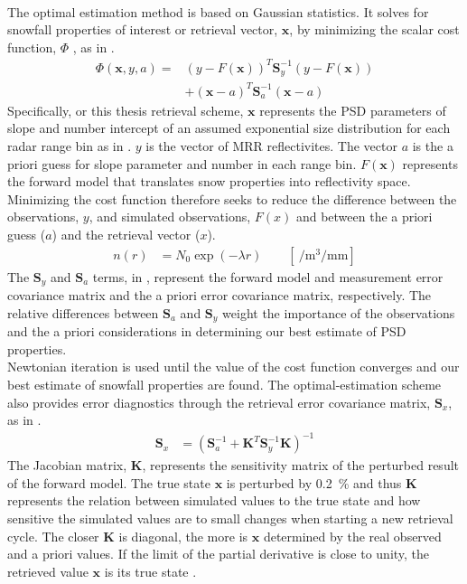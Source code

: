 \\
The optimal estimation method is based on Gaussian statistics.  It solves for snowfall properties of interest or retrieval vector, $\mathbf{x}$, by minimizing the scalar cost function, $\Phi$ , as in .
\begin{equation}
\begin{split}
\Phi(\mathbf{x},y,a) = & (y- F(\mathbf{x}))^T \mathbf{S}_y^{-1} 			(y-F(\mathbf{x})) \\
&+(\mathbf{x}-a)^T \mathbf{S}_{a}^{-1} (\mathbf{x}-a)
\end{split} \label{eq:scalar_cost_fct}
\end{equation}
Specifically, or this thesis retrieval scheme, $\mathbf{x}$ represents the PSD parameters of slope and number intercept of an assumed exponential size distribution for each radar range bin as in . $y$ is the vector of MRR reflectivites. The vector $a$ is the a priori guess for slope parameter and number in each range bin. $F(\mathbf{x})$ represents the forward model that translates snow properties into reflectivity space.  Minimizing the cost function therefore seeks to reduce the difference between the observations, $y$, and simulated observations, $F(x)$ and between the a priori guess ($a$) and the retrieval vector ($x$).
\begin{align}
	n(r) & = N_{0} \exp\left(-\lambda r\right) \qquad [ \SI{}{\per\cubic\metre\per\mm} ] \label{eq:num_dens}
\end{align}
The $\mathbf{S}_y$ and $\mathbf{S}_{a}$ terms, in , represent the forward model and measurement error covariance matrix and the a priori error covariance matrix, respectively. The relative differences between $\mathbf{S}_{a}$ and $\mathbf{S}_y$ weight the importance of the observations and the a priori considerations in determining our best estimate of PSD properties. 
\\
Newtonian iteration is used until the value of the cost function converges and our best estimate of snowfall properties are found.  The optimal-estimation scheme also provides error diagnostics through the retrieval error covariance matrix, $\mathbf{S}_x$, as in .
\begin{align}
	\mathbf{S}_x & = \left( \mathbf{S}_a^{-1} + \mathbf{K}^T \mathbf{S}_y^{-1} \mathbf{K} \right)^{-1}\label{eq:Sx}
\end{align}
The Jacobian matrix, $\mathbf{K}$, represents the sensitivity matrix of the perturbed result of the forward model. The true state $\mathbf{x}$ is perturbed by \SI{0.2}{\percent} and thus $\mathbf{K}$ represents the relation between simulated values to the true state and how sensitive the simulated values are to small changes when starting a new retrieval cycle. The closer $\mathbf{K}$ is diagonal, the more is $\mathbf{x}$ determined by the real observed and a priori values. If the limit of the partial derivative is close to unity, the retrieved value $\mathbf{x}$ is its true state \citep{wood_estimation_2011}.
